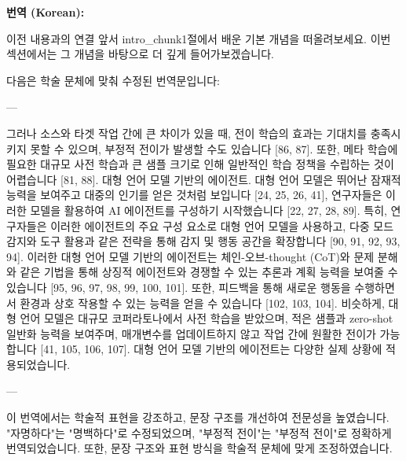 \documentclass[12pt,a4paper]{article}
\begin{document}
\begin{mdframed}[style=ko]
\noindent\textbf{\small 번역 (Korean):}\\[2pt]
\begin{linkbox}{이전 내용과의 연결}
  앞서 intro_chunk1절에서 배운 기본 개념을 떠올려보세요. 이번 섹션에서는 그 개념을 바탕으로 더 깊게 들어가보겠습니다.
\end{linkbox}
다음은 학술 문체에 맞춰 수정된 번역문입니다:

---

그러나 소스와 타겟 작업 간에 큰 차이가 있을 때, 전이 학습의 효과는 기대치를 충족시키지 못할 수 있으며, 부정적 전이가 발생할 수도 있습니다 [86, 87]. 또한, 메타 학습에 필요한 대규모 사전 학습과 큰 샘플 크기로 인해 일반적인 학습 정책을 수립하는 것이 어렵습니다 [81, 88]. 대형 언어 모델 기반의 에이전트. 대형 언어 모델은 뛰어난 잠재적 능력을 보여주고 대중의 인기를 얻은 것처럼 보입니다 [24, 25, 26, 41], 연구자들은 이러한 모델을 활용하여 AI 에이전트를 구성하기 시작했습니다 [22, 27, 28, 89]. 특히, 연구자들은 이러한 에이전트의 주요 구성 요소로 대형 언어 모델을 사용하고, 다중 모드 감지와 도구 활용과 같은 전략을 통해 감지 및 행동 공간을 확장합니다 [90, 91, 92, 93, 94]. 이러한 대형 언어 모델 기반의 에이전트는 체인-오브-thought (CoT)와 문제 분해와 같은 기법을 통해 상징적 에이전트와 경쟁할 수 있는 추론과 계획 능력을 보여줄 수 있습니다 [95, 96, 97, 98, 99, 100, 101]. 또한, 피드백을 통해 새로운 행동을 수행하면서 환경과 상호 작용할 수 있는 능력을 얻을 수 있습니다 [102, 103, 104]. 비슷하게, 대형 언어 모델은 대규모 코퍼라토나에서 사전 학습을 받았으며, 적은 샘플과 zero-shot 일반화 능력을 보여주며, 매개변수를 업데이트하지 않고 작업 간에 원활한 전이가 가능합니다 [41, 105, 106, 107]. 대형 언어 모델 기반의 에이전트는 다양한 실제 상황에 적용되었습니다.

---

이 번역에서는 학술적 표현을 강조하고, 문장 구조를 개선하여 전문성을 높였습니다. "자명하다"는 "명백하다"로 수정되었으며, "부정적 전이"는 "부정적 전이"로 정확하게 번역되었습니다. 또한, 문장 구조와 표현 방식을 학술적 문체에 맞게 조정하였습니다.


\end{mdframed}
\vspace{1em}
\end{document}
